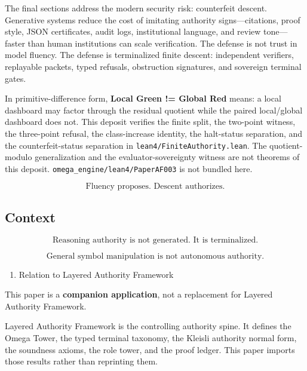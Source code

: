 \documentclass[
  10pt,
]{article}
\providecommand{\tightlist}{%
  \setlength{\itemsep}{0pt}\setlength{\parskip}{0pt}}
\providecommand{\tightlist}{%
  \setlength{\itemsep}{0pt}\setlength{\parskip}{0pt}}
\DeclareRobustCommand{\texttt}[1]{{\paperSymbolFont\nolinkurl{#1}}}
\begin{document}
The final sections address the modern security risk: counterfeit descent. Generative systems reduce the cost of imitating authority signs---citations, proof style, JSON certificates, audit logs, institutional language, and review tone---faster than human institutions can scale verification. The defense is not trust in model fluency. The defense is terminalized finite descent: independent verifiers, replayable packets, typed refusals, obstruction signatures, and sovereign terminal gates.

In primitive-difference form, \textbf{Local Green != Global Red} means: a local dashboard may factor through the residual quotient while the paired local/global dashboard does not. This deposit verifies the finite split, the two-point witness, the three-point refusal, the class-increase identity, the halt-status separation, and the counterfeit-status separation in \texttt{lean4/FiniteAuthority.lean}. The quotient-modulo generalization and the evaluator-sovereignty witness are not theorems of this deposit. \texttt{omega\_engine/lean4/PaperAF003} is not bundled here.

\protect\hypertarget{math-E0001-0001}{}{\[
\boxed{
\text{Fluency proposes. Descent authorizes.}
}
\]}

\subsection{Context}\label{context}

\protect\hypertarget{math-E0002-0002}{}{\[
\boxed{
\text{Reasoning authority is not generated. It is terminalized.}
}
\]}

\protect\hypertarget{math-E0003-0003}{}{\[
\boxed{
\text{General symbol manipulation is not autonomous authority.}
}
\]}

\begin{enumerate}
\def\labelenumi{\arabic{enumi}.}
\setcounter{enumi}{-1}
\tightlist
\item
  Relation to Layered Authority Framework
\end{enumerate}

This paper is a \textbf{companion application}, not a replacement for Layered Authority Framework.

Layered Authority Framework is the controlling authority spine. It defines the Omega Tower, the typed terminal taxonomy, the Kleisli authority normal form, the soundness axioms, the role tower, and the proof ledger. This paper imports those results rather than reprinting them.
\end{document}
